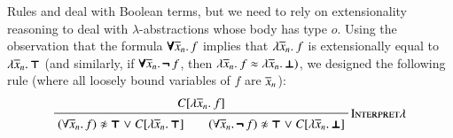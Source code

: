 
Rules  and  deal with Boolean terms,
but we need to rely on extensionality reasoning to deal with $\lambda$-abstractions
whose body has type $o$. Using the observation that the formula $\pmb{\forall} \overline{x}_{n}. \, f$ 
implies that $\lambda \overline{x}_{n}.\> f$ is extensionally equal to $\lambda \overline{x}_{n}.\> \pmb{\top}$ (and similarly, if
$\pmb{\forall} \overline{x}_{n}. \, \pmb{\neg\,} f$, then $\lambda \overline{x}_{n}.\> f \approx \lambda \overline{x}_{n}.\> \pmb{\bot})$, we
designed the following rule (where all loosely bound variables of $f$ are $\overline{x}_{n}$):
%
$$ \namedinference{Interpret$\lambda$}{C[\lam{\tuplen{x}}{f}]}
{(\forall {\tuplen{x}}.\, f) \noteq \itrue \llor C[\lam{\tuplen{x}}{\itrue}] \qquad
(\forall {\tuplen{x}}.\, \inot f) \noteq \itrue \llor C[\lam{\tuplen{x}}{\ifalse}]} $$
%

